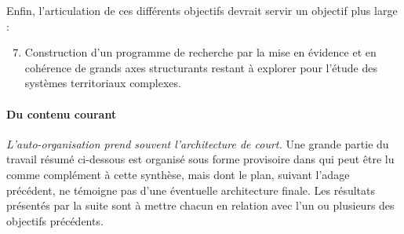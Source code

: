 Enfin, l'articulation de ces différents objectifs devrait servir un objectif plus large :
\begin{enumerate}\setcounter{enumi}{6}
\item Construction d'un programme de recherche par la mise en évidence et en cohérence de grands axes structurants restant à explorer pour l'étude des systèmes territoriaux complexes.
\end{enumerate}








\paragraph{Du contenu courant}

\emph{L'auto-organisation prend souvent l'architecture de court.} Une grande partie du travail résumé ci-dessous est organisé sous forme provisoire dans \cite{raimbault2016memoire} qui peut être lu comme complément à cette synthèse, mais dont le plan, suivant l'adage précédent, ne témoigne pas d'une éventuelle architecture finale. Les résultats présentés par la suite sont à mettre chacun en relation avec l'un ou plusieurs des objectifs précédents. 



